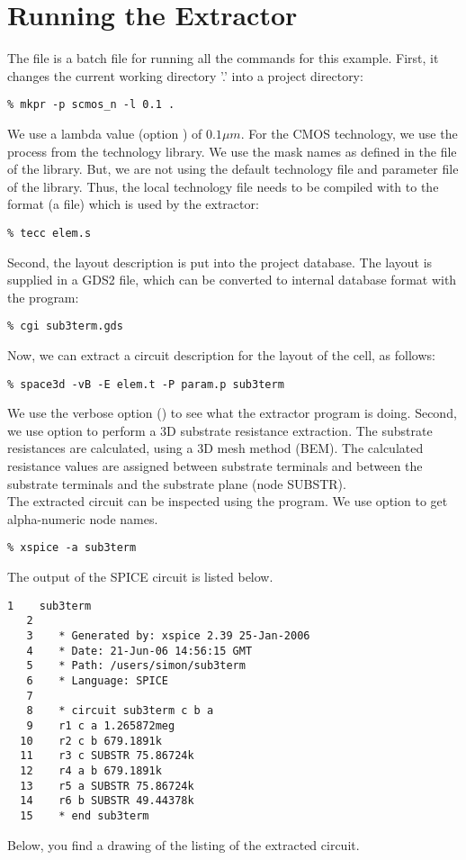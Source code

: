 \section{Running the Extractor}
The file  is a batch file for running all the commands for this example.
First, it changes the current working directory '.' into a project directory:
\small
\begin{Verbatim}
% mkpr -p scmos_n -l 0.1 .
\end{Verbatim}
\normalsize
We use a lambda value (option ) of $0.1 \mu m$.
For the CMOS technology, we use the  process from the technology library.
We use the mask names as defined in the  file of the library.
But, we are not using the default technology
file  and parameter file  of the library.
Thus, the local technology file  needs to be compiled with  to the format
(a  file) which is used by the extractor:
\small
\begin{Verbatim}
% tecc elem.s
\end{Verbatim}
\normalsize
Second, the layout description is put into the project database.
The layout is supplied in a GDS2 file, which can be converted to
internal database format with the  program:
\small
\begin{Verbatim}
% cgi sub3term.gds
\end{Verbatim}
\normalsize
Now, we can extract a circuit description for the layout of the  cell, as follows:
\small
\begin{Verbatim}
% space3d -vB -E elem.t -P param.p sub3term
\end{Verbatim}
\normalsize
We use the verbose option () to see what the extractor program is doing.
Second, we use option  to perform a 3D substrate resistance extraction.
The substrate resistances are calculated, using a 3D mesh method (BEM).
The calculated resistance values are assigned between substrate terminals and between the substrate
terminals and the substrate plane (node SUBSTR).
\\[1 ex]
The extracted circuit can be inspected using the  program.
We use option  to get alpha-numeric node names.
\small
\begin{Verbatim}
% xspice -a sub3term
\end{Verbatim}
\normalsize
The output of the SPICE circuit is listed below.

\small \begin{Verbatim}[frame=single]
   1    sub3term
   2
   3    * Generated by: xspice 2.39 25-Jan-2006
   4    * Date: 21-Jun-06 14:56:15 GMT
   5    * Path: /users/simon/sub3term
   6    * Language: SPICE
   7
   8    * circuit sub3term c b a
   9    r1 c a 1.265872meg
  10    r2 c b 679.1891k
  11    r3 c SUBSTR 75.86724k
  12    r4 a b 679.1891k
  13    r5 a SUBSTR 75.86724k
  14    r6 b SUBSTR 49.44378k
  15    * end sub3term
\end{Verbatim}
\normalsize
Below, you find a drawing of the listing of the extracted circuit.


